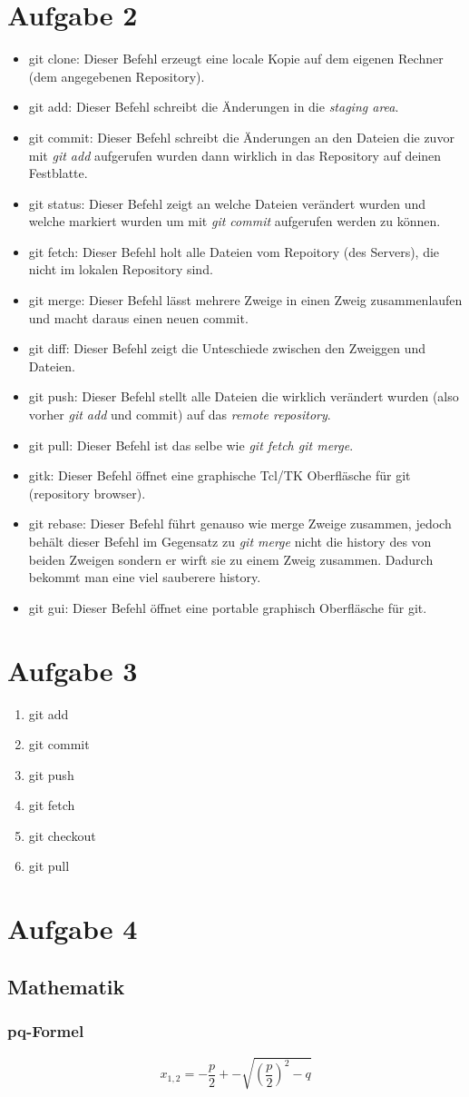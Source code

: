 \documentclass [DIN,DIV=14,pagenumber=false,parskip=full,fromalign=left,%
fontsize=12pt,%
subject=beforeopening] {scrartcl}
\begin{document}
\section*{Aufgabe 2}
\begin{itemize}
\item git clone:
	Dieser Befehl erzeugt eine locale Kopie auf dem eigenen Rechner (dem angegebenen Repository).
\item git add:
	Dieser Befehl schreibt die Änderungen in die {\em staging area}.
\item git commit:
	Dieser Befehl schreibt die Änderungen an den Dateien die zuvor mit {\em git add} aufgerufen wurden dann wirklich in das Repository auf deinen Festblatte.
\item git status:
	Dieser Befehl zeigt an welche Dateien verändert wurden und welche markiert wurden um mit {\em git commit} aufgerufen werden zu können.
\item git fetch:
	Dieser Befehl holt alle Dateien vom Repoitory (des Servers), die nicht im lokalen Repository sind.
\item git merge:
	Dieser Befehl lässt mehrere Zweige in einen Zweig zusammenlaufen und macht daraus einen neuen commit.
\item git diff:
	Dieser Befehl zeigt die Unteschiede zwischen den Zweiggen und Dateien.
\item git push:
	Dieser Befehl stellt alle Dateien die wirklich verändert wurden (also vorher {\em git add} und {\git commit}) auf das {\em remote repository}. 
\item git pull:
	Dieser Befehl ist das selbe wie {\em git fetch git merge}.
\item gitk:
	Dieser Befehl öffnet eine graphische Tcl/TK Oberfläsche für git (repository browser).
\item git rebase:
	Dieser Befehl führt genauso wie merge Zweige zusammen, jedoch behält dieser Befehl im Gegensatz zu {\em git merge} nicht die history des von beiden Zweigen sondern er wirft sie zu einem Zweig zusammen. Dadurch bekommt man eine viel sauberere history. 
\item git gui:
	Dieser Befehl öffnet eine portable graphisch Oberfläsche für git.
\end{itemize}

\section*{Aufgabe 3}
\begin{enumerate}
\item git add
\item git commit
\item git push
\item git fetch
\item git checkout
\item git pull
\end{enumerate}

\section*{Aufgabe 4}
\subsection*{Mathematik}
\subsubsection*{pq-Formel}
\[x_{1,2} = - \frac{p}{2} +- \sqrt{(\frac{p}{2})^{2} - q} \]
\end{document}
